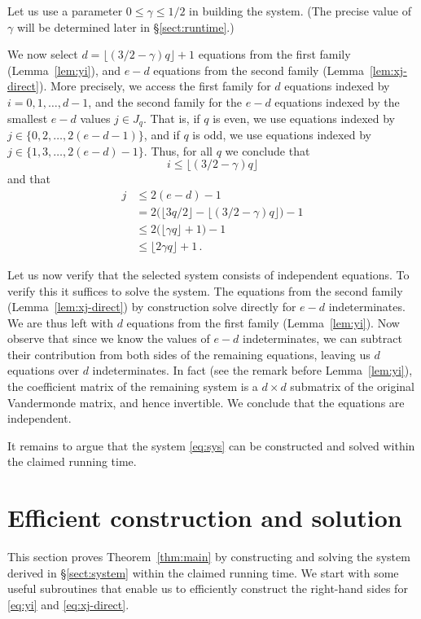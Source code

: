 \documentclass{amsart}
\begin{document}
Let us use a parameter $0\leq\gamma\leq 1/2$ 
in building the system. (The precise value of $\gamma$ will be 
determined later in \S\ref{sect:runtime}.)

We now select $d=\lfloor (3/2-\gamma)q\rfloor+1$ equations 
from the first family (Lemma~\ref{lem:yi}), and $e-d$ equations
from the second family (Lemma~\ref{lem:xj-direct}).
More precisely, we access the first family for $d$ 
equations indexed by $i=0,1,\ldots,d-1$, and the second family 
for the $e-d$ equations indexed by the smallest $e-d$ values $j\in J_q$. 
That is, if $q$ is even, we use equations indexed by 
$j\in\{0,2,\ldots,2(e-d-1)\}$, and if $q$ is odd, we use 
equations indexed by $j\in\{1,3,\ldots,2(e-d)-1\}$.
Thus, for all $q$ we conclude that 
\[
i\leq\lfloor(3/2-\gamma)q\rfloor
\]
and that 
\[
\begin{split}
j
&\leq 2(e-d)-1\\
&= 2\bigl(\lfloor 3q/2\rfloor-\lfloor(3/2-\gamma)q\rfloor\bigr)-1\\
&\leq 2\bigl(\lfloor\gamma q\rfloor+1\bigr)-1\\
&\leq \lfloor 2\gamma q\rfloor+1\,.
\end{split}
\]

Let us now verify that the selected system consists of independent 
equations. To verify this it suffices to solve the system.
The equations from the second family (Lemma~\ref{lem:xj-direct}) 
by construction solve directly for $e-d$ indeterminates. 
We are thus left with $d$ equations from the first family
(Lemma~\ref{lem:yi}). Now observe that since we know
the values of $e-d$ indeterminates, we can subtract their
contribution from both sides of the remaining equations, leaving
us $d$ equations over $d$ indeterminates. In fact (see the remark 
before Lemma~\ref{lem:yi}), the coefficient matrix of the remaining
system is a $d\times d$ submatrix of the original Vandermonde matrix,
and hence invertible. We conclude that the equations are independent.

It remains to argue that the system \eqref{eq:sys} can be constructed
and solved within the claimed running time.

\section{Efficient construction and solution}
\label{sect:solving}

This section proves Theorem~\ref{thm:main} by constructing and
solving the system derived in \S\ref{sect:system} within
the claimed running time. We start with some useful subroutines 
that enable us to efficiently construct the right-hand sides 
for \eqref{eq:yi} and \eqref{eq:xj-direct}.
\end{document}
